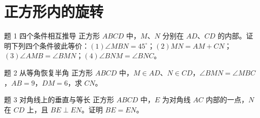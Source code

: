 \section{正方形内的旋转}

\noindent\begin{minipage}{\linewidth}
\begin{problem}{题 1 四个条件相互推导}
正方形 \(ABCD\) 中，\(M\)、\(N\) 分别在 \(AD\)、\(CD\) 的内部。证明下列四个条件彼此等价：\((1) \angle MBN=45^\circ \)；\((2) MN=AM+CN\)；\((3) \angle AMB=\angle BMN\)；\((4) \angle BNM=\angle BNC\)。
\diagram{\figTwo}
\end{problem}
\begin{problem}{题 2 从等角恢复半角}
正方形 \(ABCD\) 中，\(M\in AD\)、\(N\in CD\)，\(\angle BMN=\angle MBC\)，\(AB=9\)，\(DM=6\)，求 \(CN\)。
\diagram{\figThree}
\end{problem}
\begin{problem}{题 3 对角线上的垂直与等长}
正方形 \(ABCD\) 中，\(E\) 为对角线 \(AC\) 内部的一点，\(N\) 在 \(CD\) 上，且 \(BE\perp EN\)。证明 \(BE=EN\)。
\diagram{\figFour}
\end{problem}
\end{minipage}
\clearpage
